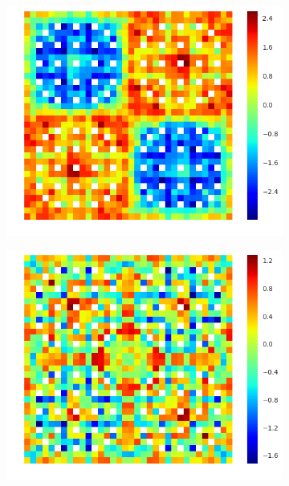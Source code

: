 \begin{figure}[h!]
\begin{subfigure}{.33\textwidth}
  \centering
  \includegraphics[width=\linewidth]{figures/quantification/2x2/degenerate-capt-err-2}
  \caption{}
  \label{fig:chap8-2x2-degenerate-capt-2}
\end{subfigure}%
\begin{subfigure}{.33\textwidth}
  \centering
  \includegraphics[width=\linewidth]{figures/quantification/2x2/degenerate-capt-err-8}
  \caption{}
  \label{fig:chap8-2x2-degenerate-capt-8}
\end{subfigure}%

\end{figure}
